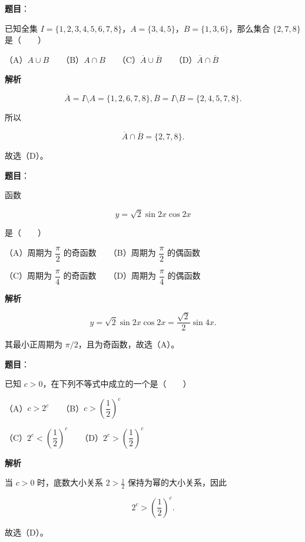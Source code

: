 \begin{answer}

\textbf{题目}：

已知全集 $I=\{1,2,3,4,5,6,7,8\}$，$A=\{3,4,5\}$，$B=\{1,3,6\}$，那么集合 $\{2,7,8\}$ 是\mbox{（　　）}

（A）$A\cup B$　　（B）$A\cap B$　　（C）$\overline A\cup\overline B$　　（D）$\overline A\cap\overline B$

\textbf{解析}

\nopagebreak[4]
\[
\overline A=I\setminus A=\{1,2,6,7,8\},
\overline B=I\setminus B=\{2,4,5,7,8\}.
\]

所以

\nopagebreak[4]
\[
\overline A\cap\overline B=\{2,7,8\}.
\]

故选（D）。


\end{answer}
\begin{answer}

\textbf{题目}：

函数

\nopagebreak[4]
\[
y=\sqrt2\sin2x\cos2x
\]

是\mbox{（　　）}

（A）周期为 $\dfrac\pi2$ 的奇函数　　（B）周期为 $\dfrac\pi2$ 的偶函数

（C）周期为 $\dfrac\pi4$ 的奇函数　　（D）周期为 $\dfrac\pi4$ 的偶函数

\textbf{解析}

\nopagebreak[4]
\[
y=\sqrt2\sin2x\cos2x=\frac{\sqrt2}{2}\sin4x.
\]

其最小正周期为 $\pi/2$，且为奇函数，故选（A）。


\end{answer}
\begin{answer}

\textbf{题目}：

已知 $c>0$，在下列不等式中成立的一个是\mbox{（　　）}

（A）$c>2^c$　　（B）$c>\left(\dfrac12\right)^c$

（C）$2^c<\left(\dfrac12\right)^c$　　（D）$2^c>\left(\dfrac12\right)^c$

\textbf{解析}

当 $c>0$ 时，底数大小关系 $2>\frac12$ 保持为幂的大小关系，因此

\nopagebreak[4]
\[
2^c>\left(\frac12\right)^c.
\]

故选（D）。


\end{answer}

